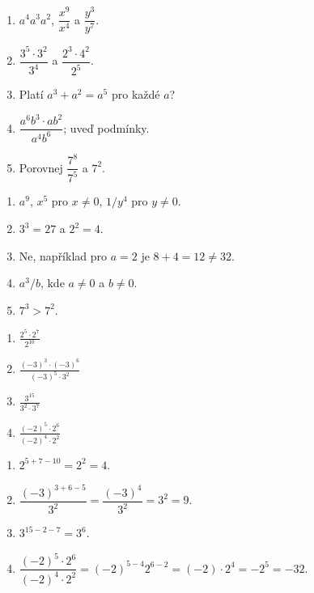 \documentclass[11pt,a4paper]{article}
\begin{document}
\begin{zadaniReseniBox}[title={Rozšíření 1},breakable=false]
\begin{enumerate}[label=\alph*)]
\item $a^4a^3a^2$, $\dfrac{x^9}{x^4}$ a $\dfrac{y^3}{y^7}$.
\item $\dfrac{3^5\cdot3^2}{3^4}$ a $\dfrac{2^3\cdot4^2}{2^5}$.
\item Platí $a^3+a^2=a^5$ pro každé $a$?
\item $\dfrac{a^6b^3\cdot ab^2}{a^4b^6}$; uveď podmínky.
\item Porovnej $\dfrac{7^8}{7^5}$ a $7^2$.
\end{enumerate}
\tcblower
\begin{enumerate}[label=\alph*)]
\item $a^9$, $x^5$ pro $x\ne0$, $1/y^4$ pro $y\ne0$.
\item $3^3=27$ a $2^2=4$.
\item Ne, například pro $a=2$ je $8+4=12\ne32$.
\item $a^3/b$, kde $a\ne0$ a $b\ne0$.
\item $7^3>7^2$.
\end{enumerate}
\end{zadaniReseniBox}

\begin{zadaniReseniBox}[title={Domácí úkol},breakable=false]
\begin{enumerate}[label=\alph*)]
\item $\displaystyle\frac{2^5\cdot2^7}{2^{10}}$
\item $\displaystyle\frac{(-3)^3\cdot(-3)^6}{(-3)^5\cdot3^2}$
\item $\displaystyle\frac{3^{15}}{3^2\cdot3^7}$
\item $\displaystyle\frac{(-2)^5\cdot2^6}{(-2)^4\cdot2^2}$
\end{enumerate}
\tcblower
\begin{enumerate}[label=\alph*),itemsep=2pt]
\item $2^{5+7-10}=\boxed{2^2}=4$.
\item $\dfrac{(-3)^{3+6-5}}{3^2}=\dfrac{(-3)^4}{3^2}
=\boxed{3^2}=9$.
\item $3^{15-2-7}=\boxed{3^6}$.
\item $\dfrac{(-2)^5\cdot2^6}{(-2)^4\cdot2^2}
=(-2)^{5-4}2^{6-2}=(-2)\cdot2^4=\boxed{-2^5}=-32$.
\end{enumerate}
\end{zadaniReseniBox}
\end{document}
